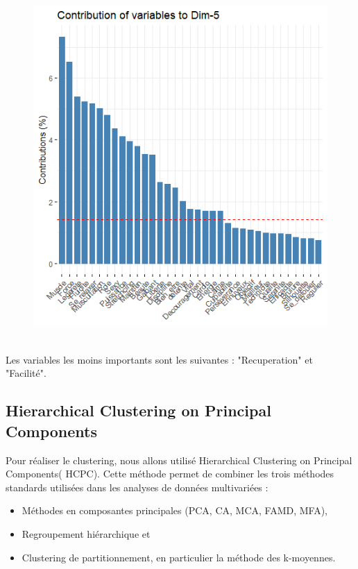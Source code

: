\documentclass[12pt]{article}
\begin{document}
\begin{figure}[H]
\begin{center}
\includegraphics[scale=1.3]{ACP_6.png} 
\caption[]{\ }
\end{center}
\end{figure}

Les variables les moins importants  sont les suivantes : "Recuperation" et  "Facilité".

\newpage   


\subsection{Hierarchical Clustering on Principal Components} 
Pour réaliser le clustering, nous allons utilisé  Hierarchical Clustering on Principal Components( HCPC).
Cette méthode permet de combiner les trois méthodes standards utilisées dans les analyses de données multivariées :

\begin{itemize}
    \item  Méthodes en composantes principales (PCA, CA, MCA, FAMD, MFA),
    \item  Regroupement hiérarchique et 
    \item  Clustering de partitionnement, en particulier la méthode des k-moyennes.
\end{itemize}
\end{document}
